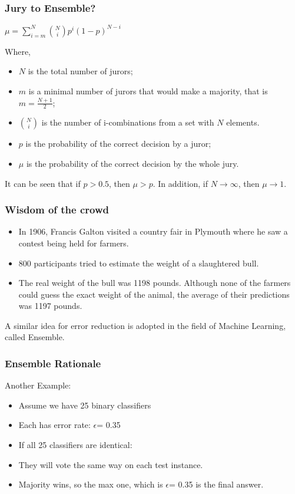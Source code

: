 \begin{frame}[fragile]\frametitle{Jury to Ensemble?}

$\mu = \sum_{i=m}^{N}{N\choose i}p^i(1-p)^{N-i}$

Where,
\begin{itemize}
\item $N$ is the total number of jurors;
\item $m$ is a minimal number of jurors that would make a majority, that is $m = \frac{N + 1}{2}$;
\item ${N \choose i}$ is the number of i-combinations from a set with $N$ elements.
\item $p$ is the probability of the correct decision by a juror;
\item $\mu$ is the probability of the correct decision by the whole jury.
\end{itemize}

It can be seen that if $p>0.5$, then $\mu >p$. In addition, if $N \rightarrow \infty$, then $\mu \rightarrow 1$.
\end{frame}

\begin{frame}[fragile]\frametitle{Wisdom of the crowd}
\begin{itemize}
\item In 1906, Francis Galton visited a country fair in Plymouth where he saw a contest being held for farmers. 
\item  800 participants tried to estimate the weight of a slaughtered bull. 
\item  The real weight of the bull was 1198 pounds. Although none of the farmers could guess the exact weight of the animal, the average of their predictions was 1197 pounds.
\end{itemize}
A similar idea for error reduction is adopted in the field of Machine Learning, called Ensemble.

\end{frame}


\begin{frame}[fragile]\frametitle{Ensemble Rationale}
Another Example:
\begin{itemize}
\item Assume we have 25 binary classifiers
\item Each has error rate: $\epsilon$= 0.35
\item If all 25 classifiers are identical:
\item They will vote the same way on each test instance.
\item Majority wins, so the max one, which is $\epsilon$= 0.35 is the final answer.
\end{itemize}
\end{frame}

